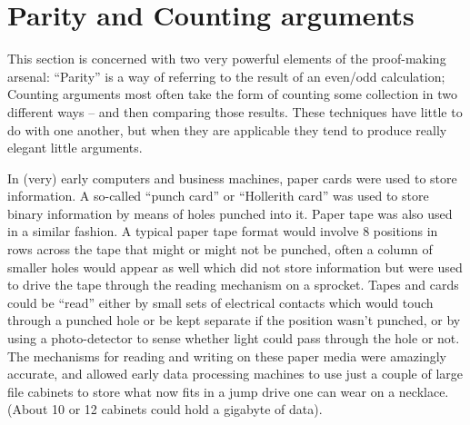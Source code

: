 \clearpage




\clearpage

\section{Parity and Counting arguments}

This section is concerned with two very powerful elements of the
proof-making arsenal: ``Parity'' is a way of referring to the result of
an even/odd calculation; Counting arguments most often take the form of
counting some collection in two different ways -- and then comparing
those results.  These techniques have little to do with one another,
but when they are applicable they tend to produce really elegant little
arguments.

In (very) early computers and business machines, paper cards were used to
store information.  A so-called ``punch card'' or 
 ``Hollerith card'' was used to store 
binary information by means of holes punched into it.  Paper tape 
was also used in a similar fashion.  A typical paper tape format would
involve 8 positions in rows across the tape that might or might not be
punched, often a column of smaller holes would appear as well which 
did not store information but were used to drive the tape through the
reading mechanism on a sprocket.  Tapes and cards could be ``read'' either
by small sets of electrical contacts which would touch through a punched
hole or be kept separate if the position wasn't punched, or by using a
photo-detector to sense whether light could pass through the hole or not. 
The mechanisms for reading and writing on these paper media were amazingly
accurate, and allowed early data processing machines to use just a couple
of large file cabinets to store what now fits in a jump drive one can
wear on a necklace. (About 10 or 12 cabinets could hold a gigabyte
of data).  

